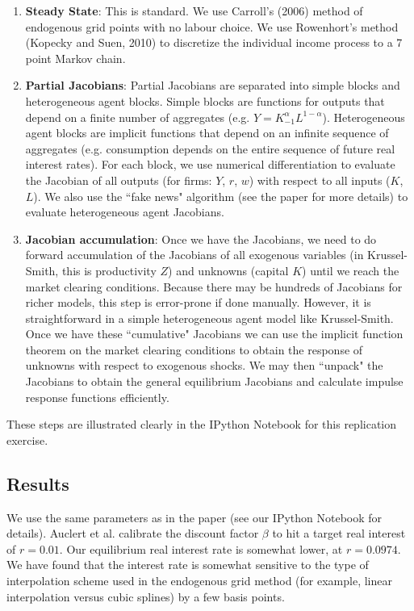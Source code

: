 \documentclass[10pt]{article} %
\begin{document}
\begin{enumerate}
\item \textbf{Steady State}: This is standard. We use Carroll's (2006) method of endogenous grid points with no labour choice. We use Rowenhort's method (Kopecky and Suen, 2010) to discretize the individual income process to a 7 point Markov chain.
\item \textbf{Partial Jacobians}: Partial Jacobians are separated into simple blocks and heterogeneous agent blocks. Simple blocks are functions for outputs that depend on a finite number of aggregates (e.g. $Y=K_{-1}^\alpha L^{1-\alpha}$). Heterogeneous agent blocks are implicit functions that depend on an infinite sequence of aggregates (e.g. consumption depends on the entire sequence of future real interest rates). For each block, we use numerical differentiation to evaluate the Jacobian of all outputs (for firms: $Y$, $r$, $w$) with respect to all inputs ($K$, $L$). We also use the ``fake news" algorithm (see the paper for more details) to evaluate heterogeneous agent Jacobians.
\item \textbf{Jacobian accumulation}: Once we have the Jacobians, we need to do forward accumulation of the Jacobians of all exogenous variables (in Krussel-Smith, this is productivity $Z$) and unknowns (capital $K$) until we reach the market clearing conditions. Because there may be hundreds of Jacobians for richer models, this step is error-prone if done manually. However, it is straightforward in a simple heterogeneous agent model like Krussel-Smith. Once we have these ``cumulative" Jacobians we can use the implicit function theorem on the market clearing conditions to obtain the response of unknowns with respect to exogenous shocks. We may then ``unpack" the Jacobians to obtain the general equilibrium Jacobians and calculate impulse response functions efficiently.
\end{enumerate}

These steps are illustrated clearly in the IPython Notebook for this replication exercise.

\subsection*{Results}

We use the same parameters as in the paper (see our IPython Notebook for details). Auclert et al. calibrate the discount factor $\beta$ to hit a target real interest of $r=0.01$. Our equilibrium real interest rate is somewhat lower, at $r=0.0974$. We have found that the interest rate is somewhat sensitive to the type of interpolation scheme used in the endogenous grid method (for example, linear interpolation versus cubic splines) by a few basis points. 
\end{document}
